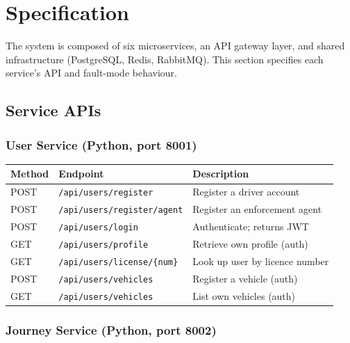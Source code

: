 \documentclass[12pt,a4paper]{article}
\begin{document}
\section{Specification}

The system is composed of six microservices, an API gateway layer, and shared infrastructure (PostgreSQL, Redis, RabbitMQ). This section specifies each service's API and fault-mode behaviour.

\subsection{Service APIs}

\subsubsection{User Service (Python, port 8001)}

\begin{table}[H]
\centering\small
\begin{tabularx}{\textwidth}{l l X}
  \toprule
  \textbf{Method} & \textbf{Endpoint} & \textbf{Description} \\
  \midrule
  POST & \texttt{/api/users/register}        & Register a driver account \\
  POST & \texttt{/api/users/register/agent}   & Register an enforcement agent \\
  POST & \texttt{/api/users/login}            & Authenticate; returns JWT \\
  GET  & \texttt{/api/users/profile}          & Retrieve own profile (auth) \\
  GET  & \texttt{/api/users/license/\{num\}}  & Look up user by licence number \\
  POST & \texttt{/api/users/vehicles}         & Register a vehicle (auth) \\
  GET  & \texttt{/api/users/vehicles}         & List own vehicles (auth) \\
  \bottomrule
\end{tabularx}
\end{table}

\subsubsection{Journey Service (Python, port 8002)}
\end{document}
